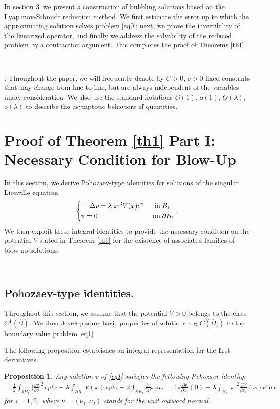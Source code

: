 \documentclass[reqno,11pt]{amsart}
\newtheorem{prop}[thm]{Proposition}
\theoremstyle{definition}
\numberwithin{equation}{section}
\newcommand{\la}{\lambda}
\renewcommand{\(}{\left(}
\renewcommand{\)}{\right)}
\renewcommand{\[}{\left[}
\renewcommand{\]}{\right]}
\newcommand{\beq}{\begin{equation}}
\newcommand{\eeq}{\end{equation}}
\begin{document}
{In section 3, we present a construction of bubbling solutions based on the Lyapunov-Schmidt reduction method. We first estimate the error up to which the approximating solution solves problem \eqref{eq0}; next, we prove
the invertibility of the linearized operator, and finally we address  the solvability of the  reduced
problem by a contraction argument. This  completes the proof of Theorems \ref{th1}.


\

: Throughout the paper, we will frequently denote by $C>0$, $c>0$ fixed
constants that may change from line to line, but are always
independent of the variables under consideration. We also use the standard
notations $O(1)$, $o(1)$, $O(\lambda)$, $o(\lambda)$ to describe
the asymptotic behaviors of quantities.

{\Large{\section{\bf{Proof of Theorem \ref{th1} Part I: Necessary Condition for Blow-Up}}}}
In this section, we derive Pohozaev-type identities for solutions of the singular Liouville equation
\beq\label{eq1}\left\{\begin{aligned}& -\Delta v=\la |x|^{2} V(x) e^v&\hbox{ in } &B_1\\ &v=0& \hbox{ on } &\partial B_1\end{aligned}\right..\eeq
  We then exploit these
integral identities to provide the necessary condition on the potential $V$ stated in Theorem \ref{th1} for the existence of associated families of 
blow-up solutions. 

\

\subsection{{\large{Pohozaev-type identities.}}} Throughout this section, we assume that 
the potential $V>0$ belongs to the class $C^1(\overline\Omega)$. 
We then develop some basic properties  of solutions  $v\in C(\overline B_1)$ to the boundary value problem \eqref{eq1}


The following proposition establishes an integral representation for the first derivatives.

\begin{prop}\label{propo1}
Any solution $v$ of \eqref{eq1} satisfies the following Pohozaev identity:
$$\begin{aligned}&\frac12\int_{\partial B_1}\bigg|\frac{\partial v}{\partial \nu}\bigg|^2  x_i d\sigma+\la\int_{\partial B_1} V(x) x_i d\sigma
+2 \int_{\partial B_1} \frac{\partial v}{\partial \nu} x_i d\sigma =4\pi \frac{\partial v}{\partial x_i}(0) +\la\int_{B_1} |x|^{2} \frac{\partial V}{\partial x_i}(x) e^vdx\end{aligned}$$
for $i=1,2,$ where $\nu=(\nu_1,\nu_2)$ stands for the unit outward normal.
\end{prop}


}
\end{document}
